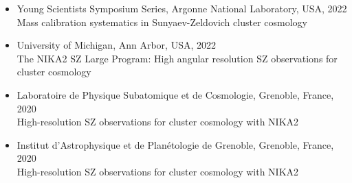 \begin{itemize}[leftmargin=20pt]

    \item Young Scientists Symposium Series, Argonne National Laboratory, USA, 2022 \\
        Mass calibration systematics in Sunyaev-Zeldovich cluster cosmology

    \item University of Michigan, Ann Arbor, USA, 2022 \\
        The NIKA2 SZ Large Program: High angular resolution SZ observations for cluster cosmology

    \item Laboratoire de Physique Subatomique et de Cosmologie, Grenoble, France, 2020 \\
        High-resolution SZ observations for cluster cosmology with NIKA2

    \item Institut d'Astrophysique et de Plan\'etologie de Grenoble, Grenoble, France, 2020 \\
        High-resolution SZ observations for cluster cosmology with NIKA2
\vspace{-5pt}
\end{itemize}
